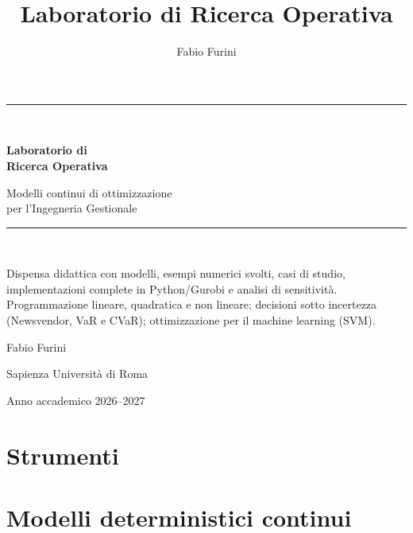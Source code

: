\documentclass[11pt,a4paper,oneside]{book}
\title{Laboratorio di Ricerca Operativa}
\author{Fabio Furini}
\begin{document}
\begin{titlepage}
  \centering
  \vspace*{1cm}
  {\color{blunotte}\rule{\textwidth}{2pt}}\\[1.2cm]
  {\Huge\bfseries\color{blunotte} Laboratorio di\\[0.3cm] Ricerca Operativa\par}
  \vspace{0.9cm}
  {\Large\color{teal} Modelli continui di ottimizzazione\\per l'Ingegneria Gestionale\par}
  \vspace{0.6cm}
  {\color{blunotte}\rule{\textwidth}{2pt}}\\[1.4cm]
  \begin{tcolorbox}[colback=tealchiaro,colframe=teal,width=0.86\textwidth,arc=2mm]
    \small Dispensa didattica con modelli, esempi numerici svolti, casi di studio,
    implementazioni complete in Python/Gurobi e analisi di sensitività.
    Programmazione lineare, quadratica e non lineare; decisioni sotto incertezza
    (Newsvendor, VaR e CVaR); ottimizzazione per il machine learning (SVM).
  \end{tcolorbox}
  \vfill
  {\large Fabio Furini\par}
  {\small Sapienza Università di Roma\par}
  \vspace{0.4cm}
  {\small Anno accademico 2026--2027\par}
\end{titlepage}

\tableofcontents

\part{Strumenti}




\part{Modelli deterministici continui}








\end{document}
